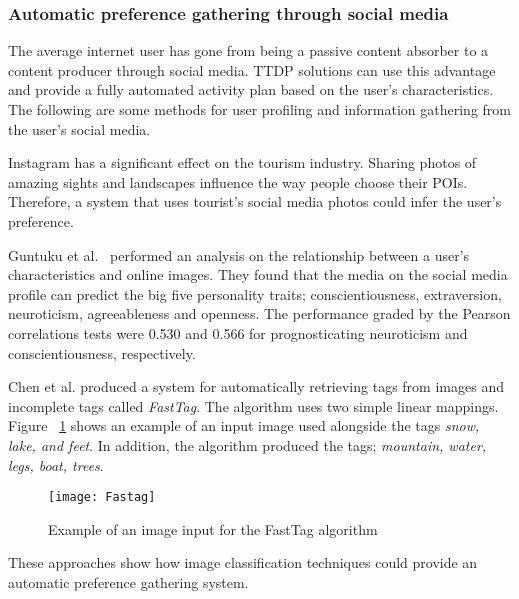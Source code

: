 \subsubsection{Automatic preference gathering through social media}

The average internet user has gone from being a
passive content absorber to a content producer through
social media. TTDP solutions can use this advantage
and provide a fully automated activity plan based on
the user's characteristics. The following are some
methods for user profiling and information gathering
from the user's social media. 


Instagram has a significant effect on the tourism
industry. Sharing photos of amazing sights and
landscapes influence the way people choose their
POIs\cite{Terttunen2017}. Therefore, a system that
uses tourist's social media photos could infer the
user's preference.

Guntuku et al.~\cite{Guntuku2017} performed an
analysis on the relationship between a user's
characteristics and online images. They found that the
media on the social media profile can predict the big
five personality traits; conscientiousness,
extraversion, neuroticism, agreeableness and openness.
The performance graded by the Pearson correlations
tests were 0.530 and 0.566 for prognosticating
neuroticism and conscientiousness, respectively.

Chen et al.\cite{Chen2013} produced a system for
automatically retrieving tags from images and
incomplete tags called \emph{FastTag}. The algorithm
uses two simple linear mappings. Figure ~\ref{fasttag}
shows an example of an input image used alongside the
tags \emph{snow, lake, and feet}. In addition, the algorithm produced the
 tags; \emph{mountain, water, legs, boat,
trees}. 


\begin{figure}[h]
\centering
\texttt{[image: Fastag]}
\caption{Example of an image input for the FastTag algorithm}
\label{fasttag}
\end{figure}

These approaches show how image classification
techniques could provide an automatic preference
gathering system.
